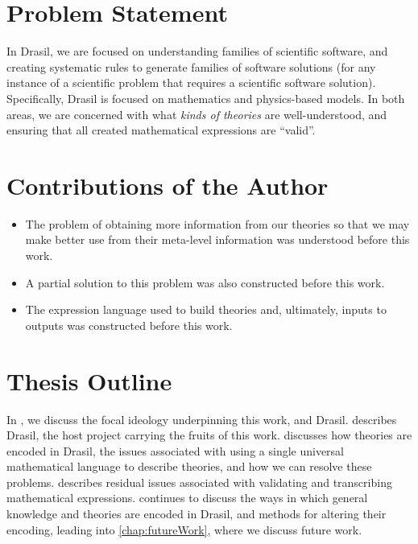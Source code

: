 \section{Problem Statement}

In Drasil, we are focused on understanding families of scientific software, and
creating systematic rules to generate families of software solutions (for any
instance of a scientific problem that requires a scientific software solution).
Specifically, Drasil is focused on mathematics and physics-based models. In both
areas, we are concerned with what \textit{kinds of theories} are
well-understood, and ensuring that all created mathematical expressions are
``valid''.


\section{Contributions of the Author}

\begin{itemize}
      \item The problem of obtaining more information from our theories so that we
            may make better use from their meta-level information was understood
            before this work.
      \item A partial solution to this problem was also constructed before this
            work.
      \item The expression language used to build theories and, ultimately, inputs
            to outputs was constructed before this work.
\end{itemize}

\section{Thesis Outline}

In , we discuss the focal ideology underpinning this work,
and Drasil.  describes Drasil, the host project carrying the
fruits of this work.  discusses how theories are encoded
in Drasil, the issues associated with using a single universal mathematical
language to describe theories, and how we can resolve these problems.
 describes residual issues associated with validating and
transcribing mathematical expressions.  continues to
discuss the ways in which general knowledge and theories are encoded in Drasil,
and methods for altering their encoding, leading into \cref{chap:futureWork},
where we discuss future work.
